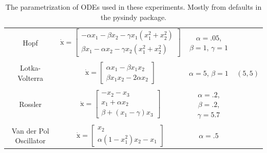 \documentclass{ACCESS_latex_template_20231118/ieeeaccess}
\renewcommand{\vec}[1]{\boldsymbol{\mathrm{#1}}}
\begin{document}
\begin{table}[ht]
\begin{tabular}{c c c c}
        Hopf
            & $\dot {\vec x} = \left[\begin{matrix}
                -\alpha x_1 -\beta x_2 - \gamma x_1(x_1 ^2 + x_2^2) \\
                \beta x_1 - \alpha x_2 -\gamma x_2(x_1 ^2 + x_2^2)
            \end{matrix}\right]$
            & $\alpha = .05$, $\beta=1 $, $\gamma=1$\\\\
        Lotka-Volterra
            & $\dot {\vec x} = \left[\begin{matrix}
                \alpha x_1 - \beta x_1 x_2 \\
                \beta x_1  x_2 - 2 \alpha x_2
            \end{matrix}\right]$
            & $\alpha = 5$, $\beta=1 $
            & $(5, 5)$ \\\\
        Rossler
            & $\dot {\vec x} = \left[\begin{matrix}
                -x_2 - x_3 \\
                x_1 + \alpha x_2\\
                \beta + (x_1 - \gamma) x_3
            \end{matrix}\right]$
            & $\alpha = .2$, $\beta=.2 $, $\gamma=5.7$\\\\
        Van der Pol Oscillator
            & $\dot {\vec x} = \left[\begin{matrix}
                x_2 \\
                \alpha(1 - x_1^2) x_2 - x_1
            \end{matrix}\right]$
        & $\alpha = .5$
    \end{tabular}
    \caption{The parametrization of ODEs used in these experiments.  Mostly from defaults in the pysindy package.}
\end{table}
\end{document}
